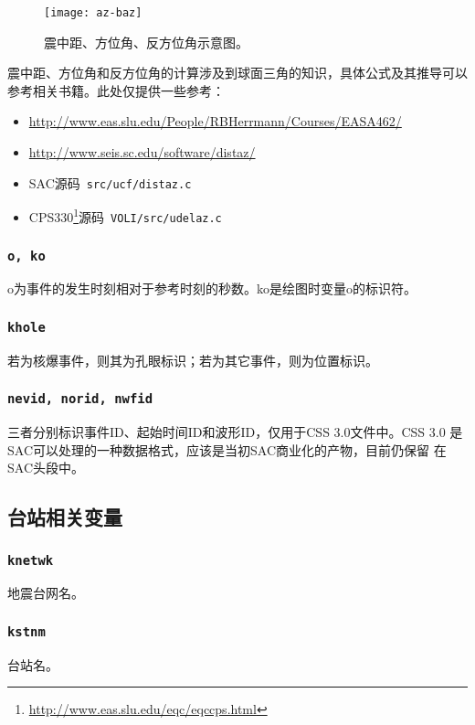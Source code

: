 \begin{figure}[H]
\centering
\texttt{[image: az-baz]}
\caption[震中距、方位角、反方位角示意图]{震中距、方位角、反方位角示意图。}
\label{fig:gcarc-dist-az-baz}
\end{figure}

震中距、方位角和反方位角的计算涉及到球面三角的知识，具体公式及其推导可以参考相关书籍。此处仅提供一些参考：

\begin{itemize}
\item \url{http://www.eas.slu.edu/People/RBHerrmann/Courses/EASA462/}
\item \url{http://www.seis.sc.edu/software/distaz/}
\item SAC源码~\verb+src/ucf/distaz.c+
\item CPS330\footnote{\url{http://www.eas.slu.edu/eqc/eqccps.html}}源码~\verb+VOLI/src/udelaz.c+
\end{itemize}

\subsubsection{\texttt{o, ko}}
o为事件的发生时刻相对于参考时刻的秒数。ko是绘图时变量o的标识符。

\subsubsection{\texttt{khole}}
若为核爆事件，则其为孔眼标识；若为其它事件，则为位置标识。

\subsubsection{\texttt{nevid, norid, nwfid}}
三者分别标识事件ID、起始时间ID和波形ID，仅用于CSS 3.0文件中。CSS 3.0
是SAC可以处理的一种数据格式，应该是当初SAC商业化的产物，目前仍保留
在SAC头段中。

\subsection{台站相关变量}
\subsubsection{\texttt{knetwk}}
地震台网名。

\subsubsection{\texttt{kstnm}}
台站名。

